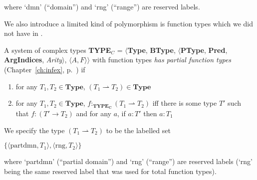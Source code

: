 where `dmn' (``domain'') and `rng' (``range'') are reserved labels.

We also introduce a limited kind of polymorphism is function types
which we did not have in \cite{Cooper2012}.

A system of complex types {\bf TYPE$_C$} = $\langle${\bf Type}, {\bf BType},
$\langle$\textbf{PType}, {\bf Pred}, \textbf{ArgIndices}, {\it
  Arity\/}$\rangle$, $\langle A,F\rangle$$\rangle$ with function types
\textit{has
  partial function types} (Chapter~\ref{ch:infex},
p.~\pageref{ex:partialfuntypes}) if
\begin{enumerate} 
 
\item for any $T_1,T_2 \in \textbf{Type}$,
  $(T_1\rightharpoonup T_2) \in \textbf{Type}$ 
 
\item for any $T_1,T_2 \in \textbf{Type}$,
  $f:_{\mathbf{TYPE_C}}(T_1\rightharpoonup T_2)$ iff there is some type $T'$ such that
  $f:(T'\rightarrow T_2)$ and for any $a$, if $a:T'$ then $a:T_1$
   
 
\end{enumerate}

We
specify the type $(T_1\rightharpoonup T_2)$   to be the labelled set

$\{\langle\mathrm{partdmn},T_1\rangle,\langle\mathrm{rng},T_2\rangle\}$

where `partdmn' (``partial domain'') and `rng' (``range'') are
reserved labels (`rng' being the same reserved label that was used for
total function types).


 
 
   
 

